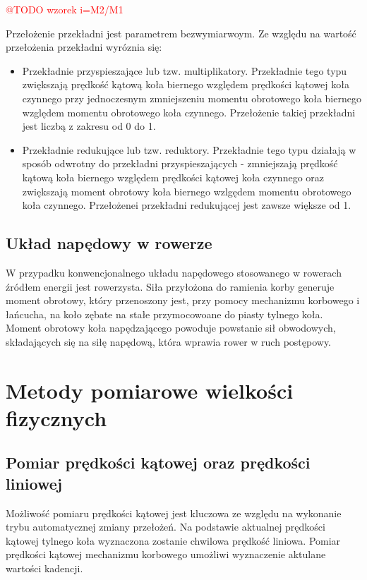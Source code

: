 \textcolor{red}{@TODO wzorek i=M2/M1}

Przełożenie przekładni jest parametrem bezwymiarwoym. Ze względu na wartość przełożenia przekładni wyróznia się:
\begin{itemize}
\item
Przekładnie przyspieszające lub tzw. multiplikatory. Przekładnie tego typu zwiększają prędkość kątową koła biernego względem prędkości kątowej koła czynnego przy jednoczesnym zmniejszeniu momentu obrotowego koła biernego względem momentu obrotowego koła czynnego. Przełożenie takiej przekładni jest liczbą z zakresu od 0 do 1.
\item
Przekładnie redukujące lub tzw. reduktory. Przekładnie tego typu działają w sposób odwrotny do przekładni przyspieszających - zmniejszają prędkość kątową koła biernego względem prędkości kątowej koła czynnego oraz zwiększają moment obrotowy koła biernego wzlgędem momentu obrotowego koła czynnego. Przełożenei przekładni redukującej jest zawsze większe od 1.
\end{itemize} 


	  
\subsection{Układ napędowy w rowerze}
W przypadku konwencjonalnego układu napędowego stosowanego w rowerach źródłem energii jest rowerzysta. Siła przyłożona do ramienia korby generuje moment obrotowy, który przenoszony jest, przy pomocy mechanizmu korbowego i łańcucha, na koło zębate na stałe przymocowoane do piasty tylnego koła. Moment obrotowy koła napędzającego powoduje powstanie sił obwodowych, składających się na siłę napędową, która wprawia rower w ruch postępowy.

\section{Metody pomiarowe wielkości fizycznych}
\subsection{Pomiar prędkości kątowej oraz prędkości liniowej}

Możliwość pomiaru prędkości kątowej jest kluczowa ze względu na wykonanie trybu automatycznej zmiany przełożeń. Na podstawie aktualnej prędkości kątowej tylnego koła wyznaczona zostanie chwilowa prędkość liniowa. Pomiar prędkości kątowej mechanizmu korbowego umożliwi wyznaczenie aktulane wartości kadencji.

